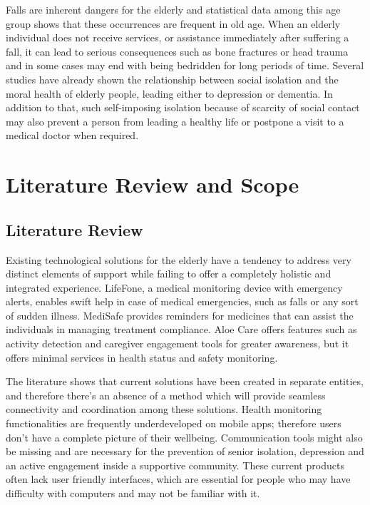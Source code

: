\documentclass{article}
\begin{document}
Falls are inherent dangers for the elderly and statistical data among this age group shows that these occurrences are frequent in old age. When an elderly individual does not receive services, or assistance immediately after suffering a fall, it can lead to serious consequences such as bone fractures or head trauma and in some cases may end with being bedridden for long periods of time.
Several studies have already shown the relationship between social isolation and the moral health of elderly people, leading either to depression or dementia. In addition to that, such self-imposing isolation because of scarcity of social contact may also prevent a person from leading a healthy life or postpone a visit to a medical doctor when required.

\section{Literature Review and Scope}
\subsection{Literature Review}

Existing technological solutions for the elderly have a tendency to address very distinct elements of support while failing to offer a completely holistic and integrated experience. LifeFone, a medical monitoring device with emergency alerts, enables swift help in case of medical emergencies, such as falls or any sort of sudden illness.  MediSafe provides reminders for medicines that can assist the individuals in managing treatment compliance.  Aloe Care offers features such as activity detection and caregiver engagement tools for greater awareness, but it offers minimal services in health status and safety monitoring.

The literature shows that current solutions have been created in separate entities, and therefore there's an absence of a method which will provide seamless connectivity and coordination among these solutions. Health monitoring functionalities are frequently underdeveloped on mobile apps; therefore users don’t have a complete picture of their wellbeing.  Communication tools might also be missing and are necessary for the prevention of senior isolation, depression and an active engagement inside a supportive community.   These current products often lack user friendly interfaces, which are essential for people who may have difficulty with computers and may not be familiar with it.
\end{document}
